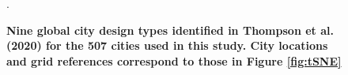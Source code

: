 \documentclass[preprint,10pt]{elsarticle} %
\begin{document}
{%
\begin{figure}
\centering
{}
\caption{\bf Nine global city design types identified in Thompson et al. (2020)\cite{Thompson2020} for the 507 cities used in this study. City locations and grid references correspond to those in Figure \ref{fig:tSNE}}.
 \label{fig:citytypes}
\end{figure}




}
\end{document}
